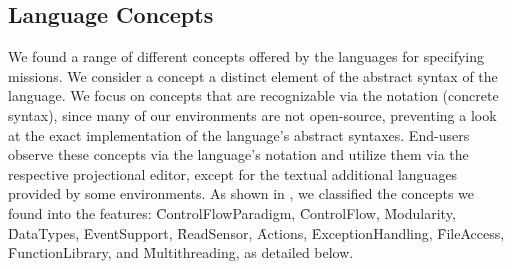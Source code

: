 \subsection{Language Concepts}\label{sec:langconcepts}

\newcommand{\fcontrolflow}{\f{ControlFlow}}
\newcommand{\fmodularity}{\f{Modularity}}
\newcommand{\fdatatypes}{\f{DataTypes}}
\newcommand{\fevents}{\f{EventSupport}}
\newcommand{\freadsensor}{\f{ReadSensor}}
\newcommand{\fcontrolflowparadigm}{\f{ControlFlowParadigm}}
\newcommand{\factions}{\f{Actions}}
\newcommand{\fexceptions}{\f{ExceptionHandling}}
\newcommand{\ffileaccess}{\f{FileAccess}}
\newcommand{\ffunctionlib}{\f{FunctionLibrary}}
\newcommand{\fmultithread}{\f{Multithreading}}


We found a range of different concepts offered by the languages for specifying missions. We consider a concept a distinct element of the abstract syntax of the language. We focus on concepts that are recognizable via the notation (concrete syntax), since many of our environments are not open-source, preventing a look at the exact implementation of the language's abstract syntaxes. End-users observe these concepts via the language's notation and utilize them via the respective projectional editor, except for the textual additional languages provided by some environments. As shown in , we classified the concepts we found into the features: \fcontrolflowparadigm, \fcontrolflow, \fmodularity, \fdatatypes, \fevents, \freadsensor, \factions, \fexceptions, \ffileaccess, \ffunctionlib, and \fmultithread, as detailed below.



